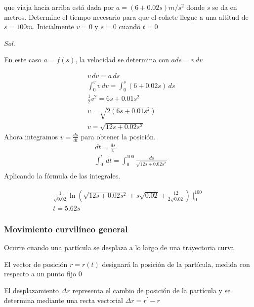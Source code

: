 \begin{problem}
    que viaja hacia arriba está dada por $a=(6+0.02s)m/s^2$ donde $s$ se da en metros. 
    Determine el tiempo necesario para que el cohete llegue a una altitud de $s=100m$. Inicialmente $v=0$ y $s=0$ cuando $t=0$
\end{problem}

\textit{ Sol. }

En este caso $a=f(s)$, la velocidad se determina con $ads=v\,dv$

\begin{align*}
    &v\,dv=a\,ds\\ 
    &\int_0^v v\,dv=\int_0^s(6+0.02s)\,ds\\
    &\frac{1}{2}v^2=6s+0.01s^2\\
    &v=\sqrt{2(6s+0.01s^2)}\\
    &v=\sqrt{12s+0.02s^2}
\end{align*}
Ahora integramos $v=\frac{ds}{dt}$ para obtener la posición.
\begin{align*}
    &dt=\frac{ds}{v}\\
    &\int_0^t\,dt=\int_0^{100}\frac{ds}{\sqrt{12s+0.02s^2}}\\
\end{align*}
Aplicando la fórmula de las integrales.

\begin{align*}
    \frac{1}{\sqrt{0.02}}\ln{\left(\sqrt{12s+0.02s^2}+s\sqrt{0.02}+\frac{12}{2\sqrt{0.02}}\right)}\mid_0^{100}\\ 
    t=5.62s
\end{align*}

\subsubsection{Movimiento curvilíneo general}

\begin{definition}
    Ocurre cuando una partícula se desplaza a lo largo de una trayectoria curva
\end{definition}

\begin{definition}[Posición]
    El vector de posición $r=r(t)$ designará la posición de la partícula, medida con respecto a un punto fijo 0
\end{definition}

\begin{definition}[Desplazamiento]
    El desplazamiento $\Delta r$ representa el cambio de posición de la partícula y se determina mediante una recta vectorial $\Delta r=r^{\prime}-r$
\end{definition}

